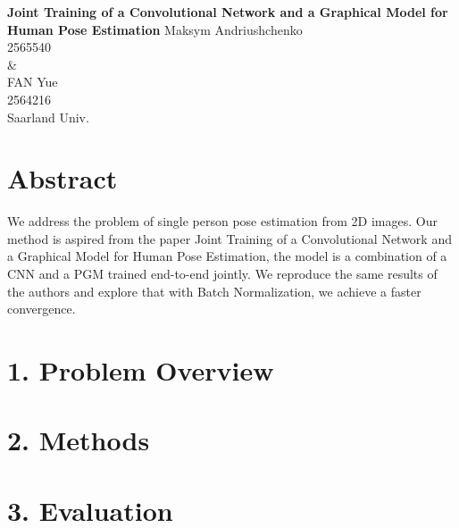 \documentclass[a4paper,11pt]{article}
\author{\textsc{Y. Fan, M. Andriushchenko}}
\newcommand\red[1]{\textcolor{red}{\textbf{#1}}}
\begin{document}
	\begin{titlepage}
		\centering
		\Large \textbf{Joint Training of a Convolutional Network and a Graphical Model for Human Pose Estimation}
		\normalsize Maksym Andriushchenko \\
		\normalsize 2565540 \\
		\normalsize \& \\
		\normalsize FAN Yue \\
		\normalsize 2564216 \\
		\normalsize Saarland Univ.
	\end{titlepage}

\newpage
	\section{Abstract}
	We address the problem of single person pose estimation from 2D images.
	Our method is aspired from the paper Joint Training of a Convolutional Network and a Graphical Model for Human Pose
	Estimation, the model is a combination of a CNN and a PGM trained end-to-end jointly. We reproduce the same results
	of the authors and explore that with Batch Normalization, we achieve a faster convergence.

\newpage
	\section{1. Problem Overview}

\newpage
	\section{2. Methods}
\newpage
	\section{3. Evaluation}
\newpage
\end{document}
